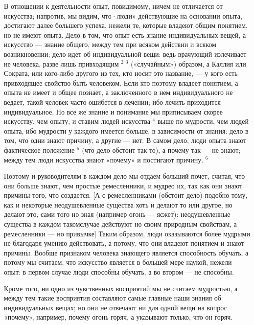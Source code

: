 \documentclass[oneside, 17pt, dvipsnames]{extbook}
\begin{document}
В отношении к деятельности опыт, повидимому, ничем не отличается от искусства; напротив, мы видим, что·люди» действующие на основании опыта, достигают далее большего успеха, нежели те, которые владеют общим понятием, но не имеют опыта. Дело в том, что опыт есть знание индивидуальных вещей, а искусство --- знание общего, между тем при всяком действии и всяком возникновении; дело идет об индивидуальной вещи: ведь врачующий излечивает не человека, разве лишь привходящим $^2 \; ^3$ («случайным») образом, а Каллия или Сократа, или кого-либо другого из тех, кто носит это название, --- у кого есть привходящее свойство быть человеком. Если кто поэтому владеет понятием, а опыта не имеет и общее познает, а заключенного в нем индивидуального не ведает, такой человек часто ошибется в лечении; ибо лечить приходится индивидуальное. Но все же знание и понимание мы приписываем скорее искусству, чем опыту, и ставим людей искусства $^4$ выше по мудрости, чем людей опыта, ибо мудрости у каждого имеется больше, в зависимости от знания: дело в том, что одни знают причину, а другие --- нет. В самом дело, люди опыта знают фактическое положение $^5$ (что дело обстоит так-то), а почему так --- не знают; между тем люди искусства знают «почему» и постигают причину. $^6$

Поэтому и руководителям в каждом дело мы отдаем больший почет, считая, что они больше знают, чем простые ремесленники, и мудрео их, так как они знают причины того, что создается. [А с ремесленниками (обстоит дело) подобно тому, как и некоторые неодушевленные существа хоть и делают то или другое, но делают это, сами того но зная (например огонь --- ясжет): неодушевленные существа в каждом такомслучае действуют но своим природным свойствам, а ремесленники --- но привычке] Таким образом, люди оказываются более мудрыми не благодаря умению действовать, а потому, что они владеют понятием и знают причины. Вообще признаком человека знающего является способность обучать, а потому мы считаем, что искусство является в большей мере наукой, нежели опыт: в первом случае люди способны обучать, а во втором --- не способны.


Кроме того, ни одно из чувственных восприятий мы не считаем мудростью, а между тем такие восприятия составляют самые главные наши знания об индивидуальных вещах; но они не отвечают ни для одной вещи на вопрос «почему», например, почему огонь горяч, а указывают только, что он горяч.
\end{document}
